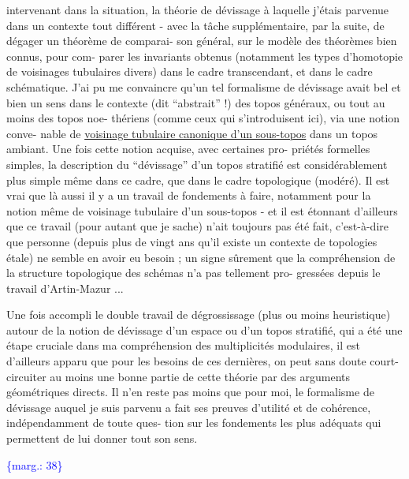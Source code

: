 \documentclass[11pt]{article}
\newcommand{\scanpage}[1]{\par\bigskip\noindent{\small\sffamily[scan #1]}\par}
\newcommand{\mspage}[1]{{\small\sffamily[p.\,#1]}}
\newcommand{\margin}[1]{\textcolor{blue}{\{\textsf{marg.:} #1\}}}
\newcommand{\uline}[1]{\underline{#1}}
\begin{document}
intervenant dans la situation, la théorie de dévissage à laquelle
j'étais parvenue dans un contexte tout différent - avec la tâche
supplémentaire, par la suite, de dégager un théorème de comparai-%
son général, sur le modèle des théorèmes bien connus, pour com-%
parer les invariants obtenus (notamment les types d'homotopie de
voisinages tubulaires divers) dans le cadre transcendant, et dans
le cadre schématique. J'ai pu me convaincre qu'un tel formalisme
de dévissage avait bel et bien un sens dans le contexte (dit
``abstrait'' !) des topos généraux, ou tout au moins des topos noe-%
thériens (comme ceux qui s'introduisent ici), via une notion conve-%
nable de \uline{voisinage tubulaire canonique d'un sous-topos} dans un
topos ambiant. Une fois cette notion acquise, avec certaines pro-%
priétés formelles simples, la description du ``dévissage'' d'un
topos stratifié est considérablement plus simple même dans ce
cadre, que dans le cadre topologique (modéré). Il est vrai que
là aussi il y a un travail de fondements à faire, notamment pour
la notion même de voisinage tubulaire d'un sous-topos - et il est
étonnant d'ailleurs que ce travail (pour autant que je sache)
n'ait toujours pas été fait, c'est-à-dire que personne (depuis plus
de vingt ans qu'il existe un contexte de topologies étale) ne
semble en avoir eu besoin ; un signe sûrement que la compréhension
de la structure topologique des schémas n'a pas tellement pro-%
gressées depuis le travail d'Artin-Mazur ...

Une fois accompli le double travail de dégrossissage
(plus ou moins heuristique) autour de la notion de dévissage d'un
espace ou d'un topos stratifié, qui a été une étape cruciale dans
ma compréhension des multiplicités modulaires, il est d'ailleurs
apparu que pour les besoins de ces dernières, on peut sans doute
court-circuiter au moins une bonne partie de cette théorie par des
arguments géométriques directs. Il n'en reste pas moins que pour
moi, le formalisme de dévissage auquel je suis parvenu a fait ses
preuves d'utilité et de cohérence, indépendamment de toute ques-%
tion sur les fondements les plus adéquats qui permettent de lui
donner tout son sens.

\margin{38}

\clearpage
\scanpage{119/39}
\mspage{37}
\end{document}
